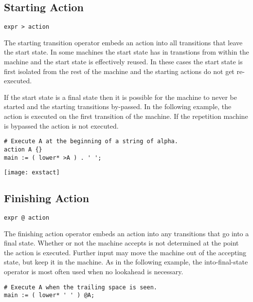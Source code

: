 \documentclass[letterpaper,11pt,oneside]{book}
\newcommand{\verbspace}{\vspace{10pt}}
\newcommand{\graphspace}{\vspace{10pt}}
\newenvironment{inline_code}{\def\baselinestretch{1}\vspace{12pt}\small}{}
\begin{document}
\subsection{Starting Action}

\verb|expr > action| 
\verbspace

The starting transition operator embeds an action into all transitions that
leave the start state. In some machines the start state has in transtions from
within the machine and the start state is effectively reused. In these cases
the start state is first isolated from the rest of the machine and the starting
actions do not get re-executed.

If the start state is a final state then it is possible for the machine to
never be started and the starting transitions by-passed.  In the following
example, the action is executed on the first transition of the machine. If the
repetition machine is bypassed the action is not executed.

\verbspace

% GENERATE: exstact
\begin{inline_code}
\begin{verbatim}
# Execute A at the beginning of a string of alpha.
action A {}
main := ( lower* >A ) . ' ';
\end{verbatim}
\end{inline_code}

\graphspace
\begin{center}
\texttt{[image: exstact]}
\end{center}
\graphspace

\subsection{Finishing Action}

\verb|expr @ action|
\verbspace

The finishing action operator embeds an action into any transitions that go into a
final state. Whether or not the machine accepts is not determined at the point
the action is executed. Further input may move the machine out of the accepting
state, but keep it in the machine. As in the following example, the
into-final-state operator is most often used when no lookahead is necessary.

\begin{inline_code}
\begin{verbatim}
# Execute A when the trailing space is seen.
main := ( lower* ' ' ) @A;
\end{verbatim}
\end{inline_code}
\end{document}
